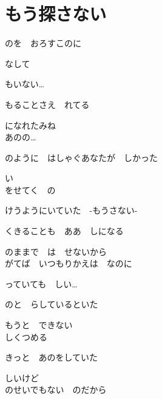 \section{ もう探さない}

\large{

のを　おろすこのに

なして

もいない…

もることさえ　れてる

になれたみね
\\

あのの…

のように　はしゃぐあなたが　しかった

い
\\

をせてく　の

けうようにいていた　-もうさない-

くきることも　ああ　しになる

のままで　は　せないから
\\

がてば　いつもりかえは　なのに

っていても　しい…

のと　らしているといた

もうと　できない
\\

しくつめる

きっと　あのをしていた

しいけど
\\

のせいでもない　のだから

}
